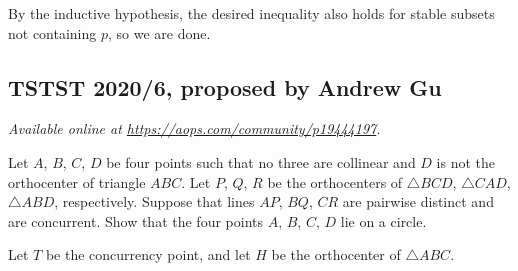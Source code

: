 \documentclass[11pt]{scrartcl}
\begin{document}
By the inductive hypothesis, the desired inequality also holds
for stable subsets not containing $p$, so we are done.
\pagebreak

\subsection{TSTST 2020/6, proposed by Andrew Gu}
\textsl{Available online at \url{https://aops.com/community/p19444197}.}
\begin{mdframed}[style=mdpurplebox,frametitle={Problem statement}]
Let $A$, $B$, $C$, $D$ be four points
such that no three are collinear
and $D$ is not the orthocenter of triangle $ABC$.
Let $P$, $Q$, $R$ be the orthocenters of
$\triangle BCD$, $\triangle CAD$, $\triangle ABD$, respectively.
Suppose that lines $AP$, $BQ$, $CR$ are pairwise distinct
and are concurrent.
Show that the four points $A$, $B$, $C$, $D$ lie on a circle.
\end{mdframed}
Let $T$ be the concurrency point,
and let $H$ be the orthocenter of $\triangle ABC$.
\end{document}
